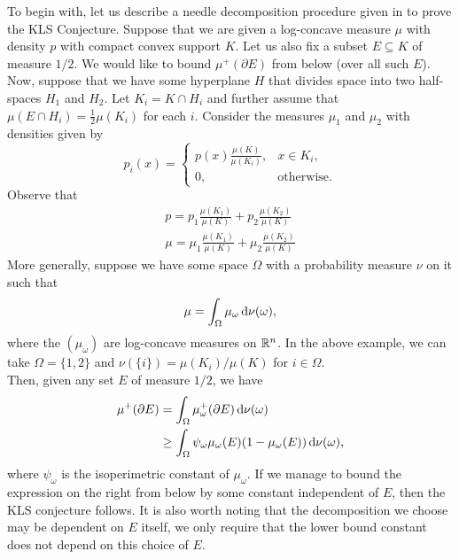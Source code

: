 \documentclass{article}
\begin{document}
		To begin with, let us describe a needle decomposition procedure given in \cite{leevempala2018klssurvey} to prove the KLS Conjecture. Suppose that we are given a log-concave measure $\mu$ with density $p$ with compact convex support $K$. Let us also fix a subset $E\subseteq K$ of measure $1/2$. We would like to bound $\mu^+(\partial E)$ from below (over all such $E$).\\
		Now, suppose that we have some hyperplane $H$ that divides space into two half-spaces $H_1$ and $H_2$. Let $K_i = K \cap H_i$ and further assume that $\mu(E \cap H_i) = \frac{1}{2}\mu(K_i)$ for each $i$. Consider the measures $\mu_1$ and $\mu_2$ with densities given by
		\[ p_i(x) =
		\begin{cases}
			p(x) \frac{\mu(K)}{\mu(K_i)}, & x \in K_i, \\
			0, & \text{otherwise.}
		\end{cases} \]
		Observe that
		\begin{equation}
			\label{eqn 1}
			\begin{gathered}
				p = p_1 \frac{\mu(K_1)}{\mu(K)} + p_2 \frac{\mu(K_2)}{\mu(K)} \\
				\mu = \mu_1 \frac{\mu(K_1)}{\mu(K)} + \mu_2 \frac{\mu(K_2)}{\mu(K)}
			\end{gathered}
		\end{equation}
		More generally, suppose we have some space $\Omega$ with a probability measure $\nu$ on it such that
		\begin{equation}
			\label{eqn 2: disintegration}
			\mu = \int_\Omega \mu_{\omega} \operatorname{d}\!{\nu}(\omega),
		\end{equation}
		where the $(\mu_\omega)$ are log-concave measures on $\mathbb{R}^n$. In the above example, we can take $\Omega = \{1,2\}$ and $\nu(\{i\}) = \mu(K_i) / \mu(K)$ for $i\in\Omega$.\\
		Then, given any set $E$ of measure $1/2$, we have
		\begin{align}
			\mu^+(\partial E) &= \int_{\Omega} \mu_\omega^+(\partial E) \operatorname{d}\!{\nu}(\omega)  \nonumber \\
				&\geq \int_\Omega \psi_\omega \mu_\omega(E) (1-\mu_\omega(E)) \operatorname{d}\!{\nu}(\omega), \label{eqn 4}
		\end{align}
		where $\psi_\omega$ is the isoperimetric constant of $\mu_\omega$. If we manage to bound the expression on the right from below by some constant independent of $E$, then the KLS conjecture follows. It is also worth noting that the decomposition we choose may be dependent on $E$ itself, we only require that the lower bound constant does not depend on this choice of $E$.
\end{document}
